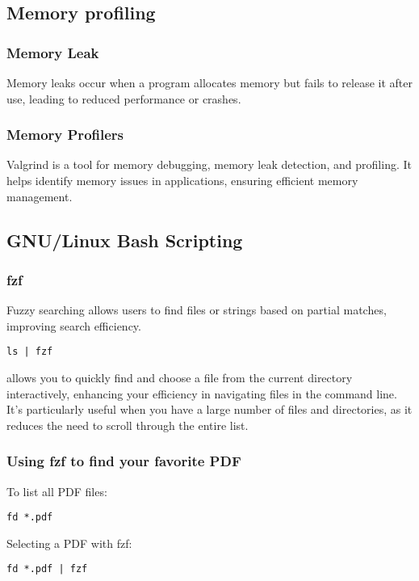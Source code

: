 \documentclass{article}
\begin{document}
\subsection{Memory profiling}  
\subsubsection{Memory Leak}
Memory leaks occur when a program allocates memory but fails to release it after use, leading to reduced performance or crashes.
\subsubsection{Memory Profilers}  
Valgrind is a tool for memory debugging, memory leak detection, and profiling. It helps identify memory issues in applications, ensuring efficient memory management.
\subsection{GNU/Linux Bash Scripting}
\subsubsection{fzf}  
Fuzzy searching allows users to find files or strings based on partial matches, improving search efficiency.
\begin{verbatim}  
ls | fzf 
\end{verbatim}  
allows you to quickly find and choose a file from the current directory interactively, enhancing your efficiency in navigating files in the command line. It's particularly useful when you have a large number of files and directories, as it reduces the need to scroll through the entire list.
\subsubsection{Using fzf to find your favorite PDF}
To list all PDF files:  
\begin{verbatim}  
fd *.pdf  
\end{verbatim}  
Selecting a PDF with fzf:  
\begin{verbatim}  
fd *.pdf | fzf  
\end{verbatim}
\end{document}

